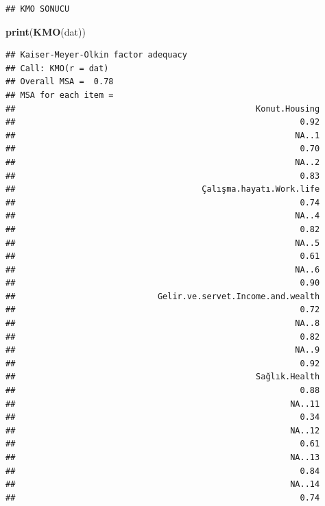 \documentclass[
]{article}
\newenvironment{Shaded}{\begin{snugshade}}{\end{snugshade}}
\newcommand{\FunctionTok}[1]{\textcolor[rgb]{0.13,0.29,0.53}{\textbf{#1}}}
\newcommand{\NormalTok}[1]{#1}
\begin{document}
\begin{verbatim}
## KMO SONUCU
\end{verbatim}

\begin{Shaded}
\begin{Highlighting}[]
\FunctionTok{print}\NormalTok{(}\FunctionTok{KMO}\NormalTok{(dat))}
\end{Highlighting}
\end{Shaded}

\begin{verbatim}
## Kaiser-Meyer-Olkin factor adequacy
## Call: KMO(r = dat)
## Overall MSA =  0.78
## MSA for each item = 
##                                                 Konut.Housing 
##                                                          0.92 
##                                                         NA..1 
##                                                          0.70 
##                                                         NA..2 
##                                                          0.83 
##                                      Çalışma.hayatı.Work.life 
##                                                          0.74 
##                                                         NA..4 
##                                                          0.82 
##                                                         NA..5 
##                                                          0.61 
##                                                         NA..6 
##                                                          0.90 
##                             Gelir.ve.servet.Income.and.wealth 
##                                                          0.72 
##                                                         NA..8 
##                                                          0.82 
##                                                         NA..9 
##                                                          0.92 
##                                                 Sağlık.Health 
##                                                          0.88 
##                                                        NA..11 
##                                                          0.34 
##                                                        NA..12 
##                                                          0.61 
##                                                        NA..13 
##                                                          0.84 
##                                                        NA..14 
##                                                          0.74 

\end{verbatim}
\end{document}
